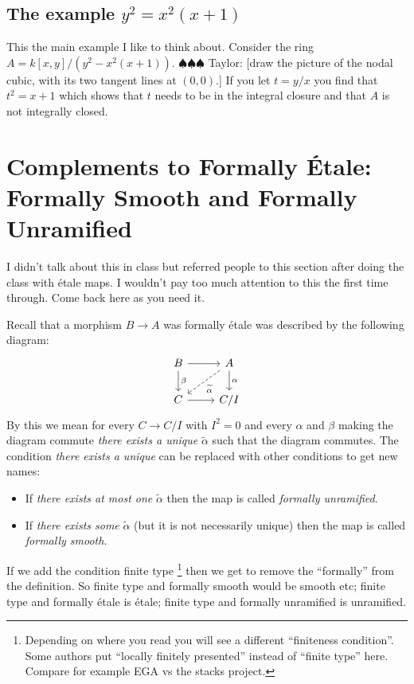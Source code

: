 \documentclass[12pt]{article}
\numberwithin{equation}{section}
\theoremstyle{definition}
\theoremstyle{remark}
\newcommand{\taylor}[1]{{\color{blue} \sf $\spadesuit\spadesuit\spadesuit$ Taylor: [#1]}}
\begin{document}
\subsection{The example $y^2=x^2(x+1)$}
This the main example I like to think about. 
Consider the ring $A=k[x,y]/(y^2-x^2(x+1))$. 
\taylor{draw the picture of the nodal cubic, with its two tangent lines at $(0,0)$.}
If you let $t=y/x$ you find that $t^2=x+1$ which shows that $t$ needs to be in the integral closure and that $A$ is not integrally closed.

\section{Complements to Formally \'Etale: Formally Smooth and Formally Unramified}
I didn't talk about this in class but referred people to this section after doing the class with \'etale maps.
I wouldn't pay too much attention to this the first time through.
Come back here as you need it.

Recall that a morphism $B \to A$ was formally \'etale was described by the following diagram:
$$ \begin{tikzcd}
B \ar[r] \ar[d, "\beta"] & A \ar[d,"\alpha"] \ar[dl, dashed, "\widetilde{\alpha}"] \\
C \ar[r] & C/I
\end{tikzcd}
$$
By this we mean for every $C\to C/I$ with $I^2=0$ and every $\alpha$ and $\beta$ making the diagram commute \emph{there exists a unique} $\widetilde{\alpha}$ such that the diagram commutes. 
The condition \emph{there exists a unique} can be replaced with other conditions to get new names:
\begin{itemize}
	\item If \emph{there exists at most one} $\widetilde{\alpha}$ then the map is called \emph{formally unramified}.
	\item If \emph{there exists some} $\widetilde{\alpha}$ (but it is not necessarily unique) then the map is called \emph{formally smooth}.
\end{itemize}
If we add the condition finite type \footnote{Depending on where you read you will see a different ``finiteness condition''. Some authors put ``locally finitely presented'' instead of ``finite type'' here.  Compare for example EGA vs the stacks project.} then we get to remove the ``formally'' from the definition. 
So finite type and formally smooth would be smooth etc; finite type and formally \'etale is \'etale; finite type and formally unramified is unramified. 
\end{document}
